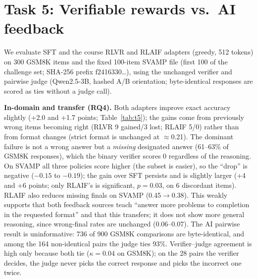 \documentclass{article}
\begin{document}
\section{Task 5: Verifiable rewards vs.\ AI feedback}
\label{sec:feedback}
We evaluate SFT and the course RLVR and RLAIF adapters (greedy, 512 tokens) on 300 GSM8K items and the fixed 100-item SVAMP file (first 100 of the challenge set; SHA-256 prefix f2416330\ldots), using the unchanged verifier and pairwise judge (Qwen2.5-3B, hashed A/B orientation; byte-identical responses are scored as ties without a judge call).

\begin{table}[t]
\centering\footnotesize
\caption{In-domain (GSM8K, $n{=}300$) and out-of-domain (SVAMP, $n{=}100$). Win rate vs.\ SFT under the AI judge (W/T/L counts). Format = strict \texttt{\#\#\#\# <number>}; ``has final'' = parser finds a designated answer. McNemar $p$ vs.\ SFT.}
\label{tab:t5}
\end{table}

\textbf{In-domain and transfer (RQ4).} Both adapters improve exact accuracy slightly (+2.0 and +1.7 points; Table~\ref{tab:t5}); the gains come from previously wrong items becoming right (RLVR 9 gained/3 lost; RLAIF 5/0) rather than from format changes (strict format is unchanged at $\approx$0.21). The dominant failure is not a wrong answer but a \emph{missing} designated answer (61--63\% of GSM8K responses), which the binary verifier scores 0 regardless of the reasoning. On SVAMP all three policies score higher (the subset is easier), so the ``drop'' is negative ($-0.15$ to $-0.19$); the gain over SFT persists and is slightly larger (+4 and +6 points; only RLAIF's is significant, $p{=}0.03$, on 6 discordant items). RLAIF also reduces missing finals on SVAMP (0.45$\to$0.38). This weakly supports that both feedback sources teach ``answer more problems to completion in the requested format'' and that this transfers; it does not show more general reasoning, since wrong-final rates are unchanged (0.06--0.07). The AI pairwise result is uninformative: 736 of 900 GSM8K comparisons are byte-identical, and among the 164 non-identical pairs the judge ties 93\%. Verifier--judge agreement is high only because both tie ($\kappa{=}0.04$ on GSM8K); on the 28 pairs the verifier decides, the judge never picks the correct response and picks the incorrect one twice.
\end{document}
